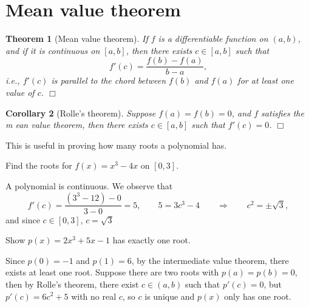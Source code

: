 \documentclass[letter-paper]{tufte-book}
\newtheorem{theorem}{\color{pastel-blue}Theorem}[section]
\newtheorem{corollary}[theorem]{\color{pastel-blue}Corollary}
\newenvironment{example}[1][Example]{\begin{trivlist}
\item[\hskip \labelsep {\bfseries #1}]}{\end{trivlist}}
\newcommand{\qedwhite}{\hfill \ensuremath{\Box}}
\begin{document}

\section{Mean value theorem}

\begin{theorem}[Mean value theorem]
  If $f$ is a differentiable function on $(a,b)$, and if it is continuous on
  $[a,b]$, then there exists $c\in[a,b]$ such that
  \begin{equation*}
    f'(c)=\frac{f(b)-f(a)}{b-a},
  \end{equation*}
  i.e., $f'(c)$ is parallel to the chord between $f(b)$ and $f(a)$ for at least
  one value of $c$. \qedwhite
\end{theorem}

\begin{corollary}[Rolle's theorem]
  Suppose $f(a)=f(b)=0$, and $f$ satisfies the m ean value theorem, then there
  exists $c\in[a,b]$ such that $f'(c)=0$. \qedwhite
\end{corollary}
This is useful in proving how many roots a polynomial has.
\begin{example}
  Find the roots for $f(x)=x^3-4x$ on $[0,3]$.
  
  A polynomial is continuous. We observe that
  \begin{equation*}
    f'(c)=\frac{(3^3-12)-0}{3-0}=5,\qquad 5=3c^3-4\qquad\Rightarrow\qquad
    c^2=\pm\sqrt{3},
  \end{equation*}
  and since $c\in[0,3]$, $c=\sqrt{3}$
\end{example}
\begin{example}
  Show $p(x)=2x^3+5x-1$ has exactly one root.
  
  Since $p(0)=-1$ and $p(1)=6$, by the intermediate value theorem, there exists
  at least one root. Suppose there are two roots with $p(a)=p(b)=0$, then by
  Rolle's theorem, there exist $c\in(a,b)$ such that $p'(c)=0$, but
  $p'(c)=6c^2+5$ with no real $c$, so $c$ is unique and $p(x)$ only has one
  root.
\end{example}
\end{document}
